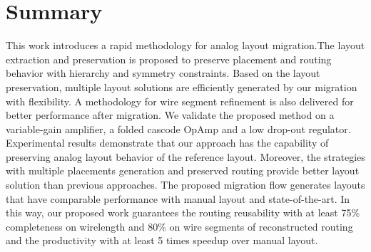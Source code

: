   \section{Summary}\label{sec:RLPADMSum}

    This work introduces a rapid methodology for analog layout migration.The layout extraction and preservation is proposed to preserve placement and routing behavior with hierarchy and symmetry constraints. Based on the layout preservation, multiple layout solutions are efficiently generated by our migration with flexibility. A methodology for wire segment refinement is also delivered for better performance after migration.
    We validate the proposed method on a variable-gain amplifier, a folded cascode OpAmp and a low drop-out regulator.
    Experimental results demonstrate that our approach has the capability of preserving analog layout behavior of the reference layout. Moreover, the strategies with multiple placements generation and preserved routing provide better layout solution than previous approaches. The proposed migration flow generates layouts that have comparable performance with manual layout and state-of-the-art. In this way, our proposed work guarantees the routing reusability with at least 75\% completeness on wirelength and 80\% on wire segments of reconstructed routing and the productivity with at least 5 times speedup over manual layout.